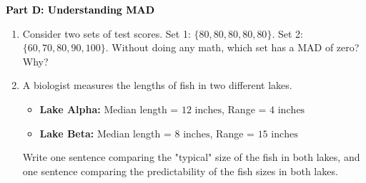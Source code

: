 \documentclass[12pt, letterpaper, fleqn]{article}
\begin{document}
\begin{tcolorbox}[colback=customteal!20]
\large\textcolor{black}{\textbf{Part D: Understanding MAD}}
\end{tcolorbox}

\vspace{3mm}

\begin{enumerate}[itemsep=4.2cm, leftmargin=0.6cm, resume]
\item Consider two sets of test scores. Set 1: $\{80, 80, 80, 80, 80\}$. Set 2: $\{60, 70, 80, 90, 100\}$. Without doing any math, which set has a MAD of zero? Why?
\item A biologist measures the lengths of fish in two different lakes. 
\begin{itemize}
\item \textbf{Lake Alpha:} Median length = $12\text{ inches}$, Range = $4\text{ inches}$
\item \textbf{Lake Beta:} Median length = $8\text{ inches}$, Range = $15\text{ inches}$
\end{itemize}
Write one sentence comparing the "typical" size of the fish in both lakes, and one sentence comparing the predictability of the fish sizes in both lakes.
\end{enumerate}
\end{document}
